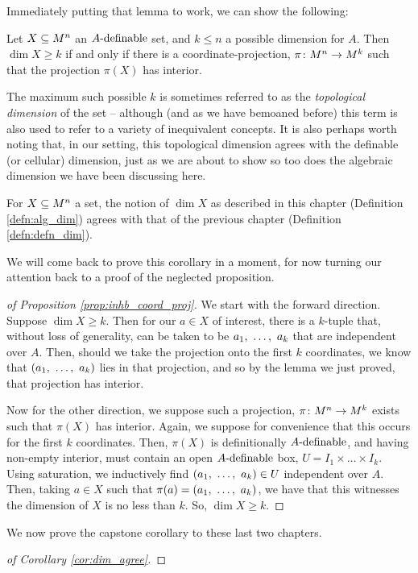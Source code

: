 Immediately putting that lemma to work, we can show the following:
\begin{proposition}
  Let $\XMn[X]{n}$ an $\Adefnb$ set, and $k \leq n$ a possible dimension for $A$. Then $\dim{X} \geq k$ if and only if there is a coordinate-projection, $\funcdom{\pi}{M^n}{M^k}$ such that the projection $\pi(X)$ has \inhb interior.
  \label{prop:inhb_coord_proj}
\end{proposition}

\begin{remark}
  The maximum such possible $k$ is sometimes referred to as the \emph{topological dimension} of the set -- although (and as we have bemoaned before) this term is also used to refer to a variety of inequivalent concepts. It is also perhaps worth noting that, in our setting, this topological dimension agrees with the definable (or cellular) dimension, just as we are about to show so too does the algebraic dimension we have been discussing here.
\end{remark}

\begin{corollary}
  For $\XMn[X]{n}$ a  set, the notion of $\dim{X}$ as described in this chapter (Definition \ref{defn:alg_dim}) agrees with that of the previous chapter (Definition \ref{defn:defn_dim}).
  \label{cor:dim_agree}
\end{corollary}

We will come back to prove this corollary in a moment, for now turning our attention back to a proof of the neglected proposition.
\begin{proof}[of Proposition \ref{prop:inhb_coord_proj}]
  We start with the forward direction. Suppose $\dim{X} \geq k$. Then for our $a \in X$ of interest, there is a $k$-tuple that, without loss of generality, can be taken to be $\vonevm{a}{k}$ that are independent over $A$. Then, should we take the projection onto the first $k$ coordinates, we know that $(\vonevm{a}{k})$ lies in that projection, and so by the lemma we just proved, that projection has \inhb interior.

  Now for the other direction, we suppose such a projection, $\funcdom{\pi}{M^n}{M^k}$ exists such that $\pi(X)$ has \inhb interior. Again, we suppose for convenience that this occurs for the first $k$ coordinates. Then, $\pi(X)$ is definitionally $\Adefnb$, and having non-empty interior, must contain an open $\Adefnb$ box, $U = I_1 \times \hdots \times I_k$. Using saturation, we inductively find $(\vonevm{a}{k}) \in U$ independent over $A$. Then, taking $a \in X$ such that $\pi(a) = (\vonevm{a}{k})$, we have that this witnesses the dimension of $X$ is no less than $k$. So, $\dim{X} \geq k$.
\end{proof}

We now prove the capstone corollary to these last two chapters.
\begin{proof}[of Corollary \ref{cor:dim_agree}]
\end{proof}


